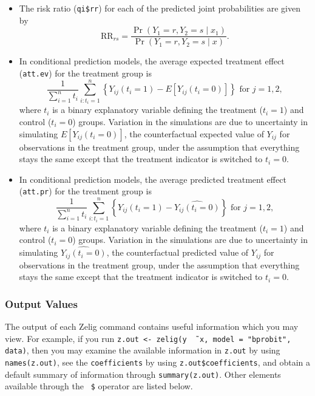 \begin{itemize}
\item The risk ratio ({\tt qi\$rr}) for each of the predicted joint
  probabilities are given by
\begin{equation*}
\textrm{RR}_{rs} = \frac{\Pr(Y_1=r, Y_2=s \mid x_1)}{\Pr(Y_1=r, Y_2=s \mid x)}.
\end{equation*}

\item In conditional prediction models, the average expected treatment
  effect ({\tt att.ev}) for the treatment group is 
    \begin{equation*} \frac{1}{\sum_{i=1}^n t_i}\sum_{i:t_i=1}^n \left\{ Y_{ij}(t_i=1) -
      E[Y_{ij}(t_i=0)] \right\} \textrm{ for } j = 1,2,
    \end{equation*} 
    where $t_i$ is a binary explanatory variable defining the treatment
    ($t_i=1$) and control ($t_i=0$) groups.  Variation in the
    simulations are due to uncertainty in simulating $E[Y_{ij}(t_i=0)]$,
    the counterfactual expected value of $Y_{ij}$ for observations in the
    treatment group, under the assumption that everything stays the
    same except that the treatment indicator is switched to $t_i=0$.

\item In conditional prediction models, the average predicted treatment
  effect ({\tt att.pr}) for the treatment group is 
    \begin{equation*} \frac{1}{\sum_{i=1}^n t_i}\sum_{i:t_i=1}^n \left\{ Y_{ij}(t_i=1) -
      \widehat{Y_{ij}(t_i=0)}\right\} \textrm{ for } j = 1,2,
    \end{equation*} 
    where $t_i$ is a binary explanatory variable defining the treatment
    ($t_i=1$) and control ($t_i=0$) groups.  Variation in the
    simulations are due to uncertainty in simulating
    $\widehat{Y_{ij}(t_i=0)}$, the counterfactual predicted value of
    $Y_{ij}$ for observations in the treatment group, under the
    assumption that everything stays the same except that the
    treatment indicator is switched to $t_i=0$.

\end{itemize}

\subsubsection{Output Values}

The output of each Zelig command contains useful information which you
may view.  For example, if you run \texttt{z.out <- zelig(y \~\, x,
  model = "bprobit", data)}, then you may examine the available
information in \texttt{z.out} by using \texttt{names(z.out)},
see the {\tt coefficients} by using {\tt z.out\$coefficients}, and
obtain a default summary of information through
\texttt{summary(z.out)}.  Other elements available through the {\tt
  \$} operator are listed below.

